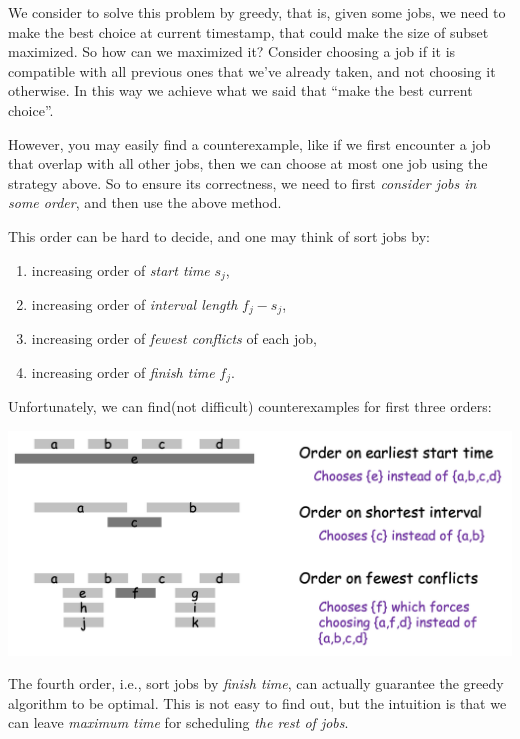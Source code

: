 \begin{spacing}{1.3}
    We consider to solve this problem by greedy, that is, given some jobs, we need 
    to make the best choice at current timestamp, that could make the size of subset maximized.
    So how can we maximized it? Consider choosing a job if it is compatible with all previous ones 
    that we've already taken, and not choosing it otherwise. In this way we achieve what we said that 
    ``make the best current choice''.

    However, you may easily find a counterexample, like if we first encounter a job that overlap 
    with all other jobs, then we can choose at most one job using the strategy above. So to ensure 
    its correctness, we need to first {\it consider jobs in some order}, and then use the above method.

    This order can be hard to decide, and one may think of sort jobs by:
    \begin{enumerate}
        \item increasing order of {\it start time} $s_j$,
        \item increasing order of {\it interval length} $f_j-s_j$,
        \item increasing order of {\it fewest conflicts} of each job,
        \item increasing order of {\it finish time} $f_j$.
    \end{enumerate}

    Unfortunately, we can find(not difficult) counterexamples for first three orders:
    \begin{center}
        \includegraphics[scale=0.35]{images/07-interval-countereg.png}
    \end{center}

    The fourth order, i.e., sort jobs by {\it finish time}, can actually guarantee the greedy 
    algorithm to be optimal. This is not easy to find out, but the intuition is that 
    we can leave {\it maximum time} for scheduling {\it the rest of jobs}.


\end{spacing}
